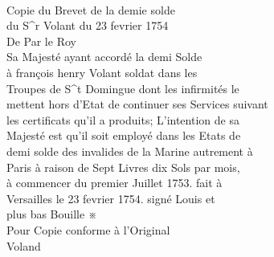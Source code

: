 \documentclass{article}
\begin{document}
\begin{pages}
\\
Copie du Brevet de la demie solde\\
du S\^{}r Volant du 23 fevrier 1754\\
De Par le Roy\\
Sa Majesté ayant accordé la demi Solde\\
à françois henry Volant soldat dans les\\
Troupes de S\^{}t Domingue dont les infirmités le\\
mettent hors d'Etat de continuer ses Services suivant\\
les certificats qu'il a produits; L'intention de sa\\
Majesté est qu'il soit employé dans les Etats de\\
demi solde des invalides de la Marine autrement à\\
Paris à raison de Sept Livres dix Sols par mois,\\
à commencer du premier Juillet 1753. fait à\\
Versailles le 23 fevrier 1754. signé Louis et\\
plus bas Bouille ※\\
Pour Copie conforme à l'Original\\
Voland
\pend
\endnumbering
\end{pages}
\end{document}
